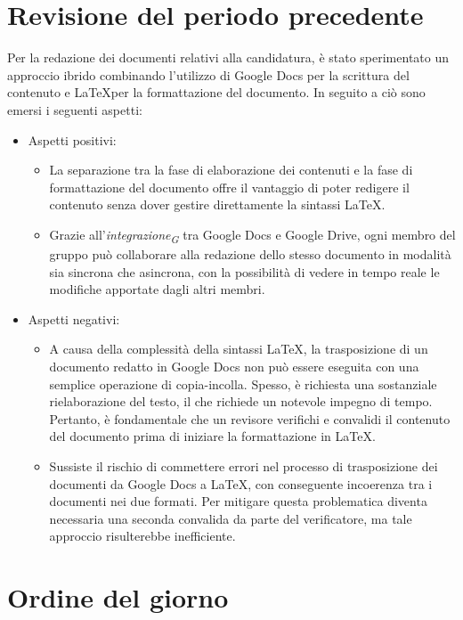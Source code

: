 \documentclass{article}
\begin{document}
\section{Revisione del periodo precedente}
Per la redazione dei documenti relativi alla candidatura, è stato sperimentato un approccio ibrido combinando l'utilizzo di Google Docs per la scrittura del contenuto e \LaTeX per la formattazione del documento. In seguito a ciò sono emersi i seguenti aspetti: 
\begin{itemize}
    \item Aspetti positivi:  
        \begin{itemize}
            \item La separazione tra la fase di elaborazione dei contenuti e la fase di formattazione del documento offre il vantaggio di poter redigere il contenuto senza dover gestire direttamente la sintassi \LaTeX.
            \item Grazie all’\textit{integrazione}\textsubscript{\textit{G}} tra Google Docs e Google Drive, ogni membro del gruppo può collaborare alla redazione dello stesso documento in modalità sia sincrona che asincrona, con la possibilità di vedere in tempo reale le modifiche apportate dagli altri membri.
        \end{itemize}
    \item Aspetti negativi:  
        \begin{itemize}
            \item A causa della complessità della sintassi \LaTeX, la trasposizione di un documento redatto in Google Docs non può essere eseguita con una semplice operazione di copia-incolla. Spesso, è richiesta una sostanziale rielaborazione del testo, il che richiede un notevole impegno di tempo. Pertanto, è fondamentale che un revisore verifichi e convalidi il contenuto del documento prima di iniziare la formattazione in \LaTeX.
            \item Sussiste il rischio di commettere errori nel processo di trasposizione dei documenti da Google Docs a \LaTeX, con conseguente incoerenza tra i documenti nei due formati. Per mitigare questa problematica diventa necessaria una seconda convalida da parte del verificatore, ma tale approccio risulterebbe inefficiente.
        \end{itemize}
\end{itemize}

\section{Ordine del giorno}
\end{document}
